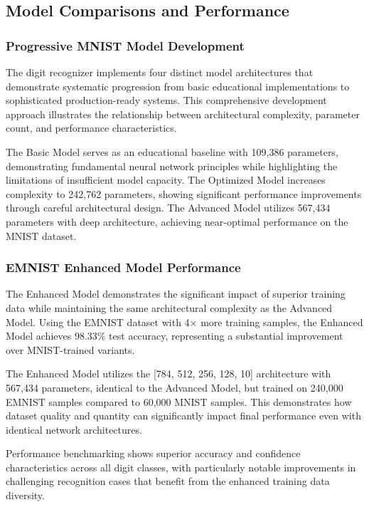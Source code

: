 \documentclass[11pt,a4paper]{report}
\begin{document}
\subsection{Model Comparisons and Performance}

\subsubsection{Progressive MNIST Model Development}

The digit recognizer implements four distinct model architectures that demonstrate systematic progression from basic educational implementations to sophisticated production-ready systems. This comprehensive development approach illustrates the relationship between architectural complexity, parameter count, and performance characteristics.

The Basic Model serves as an educational baseline with 109,386 parameters, demonstrating fundamental neural network principles while highlighting the limitations of insufficient model capacity. The Optimized Model increases complexity to 242,762 parameters, showing significant performance improvements through careful architectural design. The Advanced Model utilizes 567,434 parameters with deep architecture, achieving near-optimal performance on the MNIST dataset.

\subsubsection{EMNIST Enhanced Model Performance}

The Enhanced Model demonstrates the significant impact of superior training data while maintaining the same architectural complexity as the Advanced Model. Using the EMNIST dataset with 4× more training samples, the Enhanced Model achieves 98.33\% test accuracy, representing a substantial improvement over MNIST-trained variants.

The Enhanced Model utilizes the [784, 512, 256, 128, 10] architecture with 567,434 parameters, identical to the Advanced Model, but trained on 240,000 EMNIST samples compared to 60,000 MNIST samples. This demonstrates how dataset quality and quantity can significantly impact final performance even with identical network architectures.

Performance benchmarking shows superior accuracy and confidence characteristics across all digit classes, with particularly notable improvements in challenging recognition cases that benefit from the enhanced training data diversity.
\end{document}
